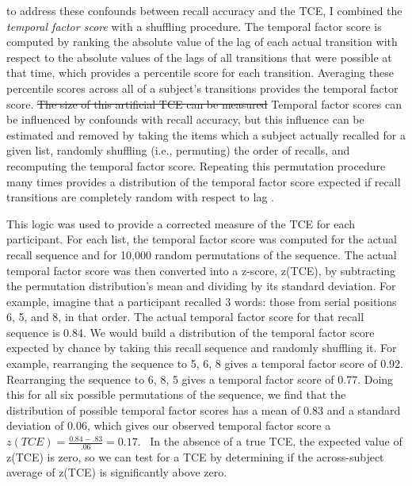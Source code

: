 \documentclass[man,natbib,floatsintext]{apa6} %
\begin{document}
\color{red} to address these confounds between recall accuracy and the TCE, I combined the \emph{temporal factor score} \citep{SedeEtal10,PolyEtal09} with a shuffling procedure\color{black}. The temporal factor score is computed by ranking the absolute value of the lag of each actual transition with respect to the absolute values of the lags of all transitions that were possible at that time, which provides a percentile score for each transition. Averaging these percentile scores across all of a subject's transitions provides the temporal factor score.
\st{The size of this artificial TCE can be measured} \color{red}Temporal factor scores can be influenced by confounds with recall accuracy, but this influence can be estimated and removed \color{black} by taking the items which a subject actually recalled for a given list, randomly shuffling (i.e., permuting) the order of recalls, and recomputing the temporal factor score. Repeating this permutation procedure many times provides a distribution of the temporal factor score expected if recall transitions are completely random with respect to lag \citep{HealKaha17}. 

This logic was used to provide a corrected measure of the TCE for each participant. For each list, the temporal factor score was computed for the actual recall sequence and for 10,000 random permutations of the sequence. The actual temporal factor score was then converted into a z-score, z(TCE), by subtracting the permutation distribution's mean and dividing by its standard deviation.  \color{red}\label{TCEex} For example, imagine that a participant recalled 3 words: those from serial positions 6, 5, and 8, in that order. The actual temporal factor score for that recall sequence is 0.84. We would build a distribution of the temporal factor score expected by chance by taking this recall sequence and randomly shuffling it. For example, rearranging the sequence to 5, 6, 8 gives a temporal factor score of 0.92. Rearranging the sequence to 6, 8, 5 gives a temporal factor score of 0.77. Doing this for all six possible permutations of the sequence, we find that the distribution of possible temporal factor scores has a mean of 0.83 and a standard deviation of 0.06, which gives our observed temporal factor score a $z(TCE)=\frac{0.84-.83}{.06}=0.17$. \color{black}~In the absence of a true TCE, the expected value of z(TCE) is zero, so we can test for a TCE by determining if the across-subject average of z(TCE) is significantly above zero.  
\end{document}
